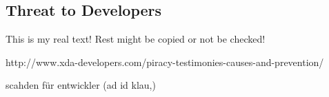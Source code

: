 \subsection{Threat to Developers} \label{subsection:foundation-piracy-developers}
This is my real text! Rest might be copied or not be checked!

http://www.xda-developers.com/piracy-testimonies-causes-and-prevention/

scahden für entwickler (ad id klau,)\newline

